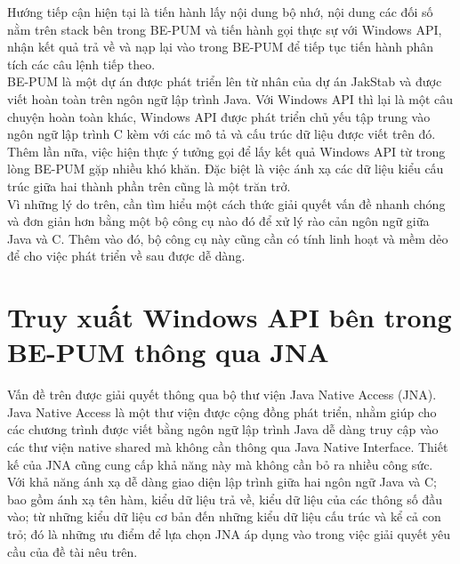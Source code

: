 Hướng tiếp cận hiện tại là tiến hành lấy nội dung bộ nhớ, nội dung các đối số nằm trên stack bên trong BE-PUM và tiến hành gọi thực sự với Windows API, nhận kết quả trả về và nạp lại vào trong BE-PUM để tiếp tục tiến hành phân tích các câu lệnh tiếp theo.\\

BE-PUM là một dự án được phát triển lên từ nhân của dự án JakStab và được viết hoàn toàn trên ngôn ngữ lập trình Java. Với Windows API thì lại là một câu chuyện hoàn toàn khác, Windows API được phát triển chủ yếu tập trung vào ngôn ngữ lập trình C kèm với các mô tả và cấu trúc dữ liệu được viết trên đó. Thêm lần nữa, việc hiện thực ý tưởng gọi để lấy kết quả Windows API từ trong lòng BE-PUM gặp nhiều khó khăn. Đặc biệt là việc ánh xạ các dữ liệu kiểu cấu trúc giữa hai thành phần trên cũng là một trăn trở.\\

Vì những lý do trên, cần tìm hiểu một cách thức giải quyết vấn đề nhanh chóng và đơn giản hơn bằng một bộ công cụ nào đó để xử lý rào cản ngôn ngữ giữa Java và C. Thêm vào đó, bộ công cụ này cũng cần có tính linh hoạt và mềm dẻo để cho việc phát triển về sau được dễ dàng.\\



\section{Truy xuất Windows API bên trong BE-PUM thông qua JNA}

Vấn đề trên được giải quyết thông qua bộ thư viện Java Native Access (JNA).\\

Java Native Access là một thư viện được cộng đồng phát triển, nhằm giúp cho các chương trình được viết bằng ngôn ngữ lập trình Java dễ dàng truy cập vào các thư viện native shared mà không cần thông qua Java Native Interface. Thiết kế của JNA cũng cung cấp khả năng này mà không cần bỏ ra nhiều công sức.\\

Với khả năng ánh xạ dễ dàng giao diện lập trình giữa hai ngôn ngữ Java và C; bao gồm ánh xạ tên hàm, kiểu dữ liệu trả về, kiểu dữ liệu của các thông số đầu vào; từ những kiểu dữ liệu cơ bản đến những kiểu dữ liệu cấu trúc và kể cả con trỏ; đó là những ưu điểm để lựa chọn JNA áp dụng vào trong việc giải quyết yêu cầu của đề tài nêu trên.